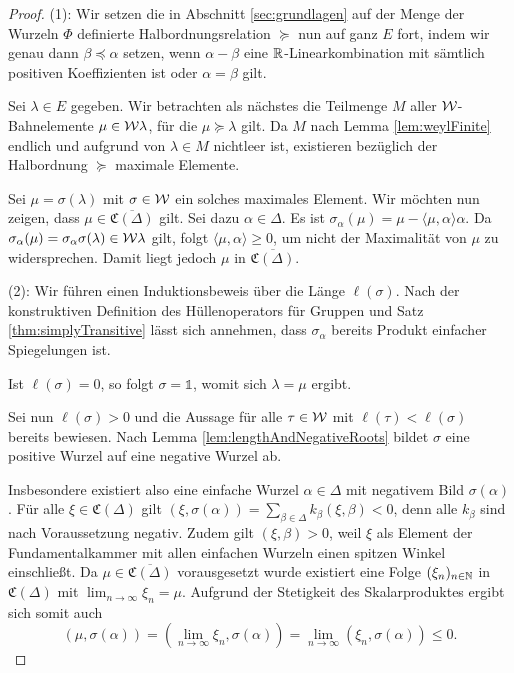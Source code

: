 \begin{proof}
  (1):
  Wir setzen die in Abschnitt \ref{sec:grundlagen} auf der Menge der Wurzeln $\Phi$ definierte Halb\-ordnungsrelation $\succeq$ nun auf ganz $E$ fort, indem wir genau dann $\beta \preceq \alpha$ setzen, wenn $\alpha - \beta$ eine $\mathbb{R}$-Linearkombination mit sämtlich positiven Koeffizienten ist oder $\alpha = \beta$ gilt.

  Sei $\lambda \in E$ gegeben. 
  Wir betrachten als nächstes die Teilmenge $M$ aller $\mathcal{W}$\hyp{}Bahnelemente $\mu \in \mathcal{W}\lambda$, für die $\mu \succeq \lambda$ gilt.
  Da $M$ nach Lemma \ref{lem:weylFinite} endlich und aufgrund von $\lambda \in M$ nichtleer ist, existieren bezüglich der Halbordnung $\succeq$ maximale Elemente.

  Sei $\mu = \sigma(\lambda)$ mit $\sigma \in \mathcal{W}$ ein solches maximales Element.
  Wir möchten nun zeigen, dass $\mu \in \overline{\mathfrak{C}(\Delta)}$ gilt.
  Sei dazu $\alpha \in \Delta$.
  Es ist $\sigma_\alpha(\mu) = \mu - \langle \mu, \alpha \rangle \alpha$.
  Da $\sigma_\alpha(\mu) = \sigma_\alpha \sigma (\lambda) \in \mathcal{W}\lambda$ gilt, folgt $\langle \mu, \alpha \rangle \geq 0$, um nicht der Maximalität von $\mu$ zu widersprechen.
  Damit liegt jedoch $\mu$ in $\overline{\mathfrak{C}(\Delta)}$.

  (2):
  Wir führen einen Induktionsbeweis über die Länge $\ell(\sigma)$.
  Nach der konstruktiven Definition des Hüllenoperators für Gruppen und Satz \ref{thm:simplyTransitive} lässt sich annehmen, dass $\sigma_\alpha$ bereits Produkt einfacher Spiegelungen ist.

  Ist $\ell(\sigma) = 0$, so folgt $\sigma = \mathds{1}$, womit sich $\lambda = \mu$ ergibt.

  Sei nun $\ell(\sigma) > 0$ und die Aussage für alle $\tau \in \mathcal{W}$ mit $\ell(\tau) < \ell(\sigma)$ bereits bewiesen.
  Nach Lemma \ref{lem:lengthAndNegativeRoots} bildet $\sigma$ eine positive Wurzel auf eine negative Wurzel ab.
  
  Insbesondere existiert also eine einfache Wurzel $\alpha \in \Delta$ mit negativem Bild $\sigma(\alpha)$.
  Für alle $\xi \in \mathfrak{C}(\Delta)$ gilt $(\xi, \sigma(\alpha)) = \sum_{\beta \in \Delta} k_\beta (\xi,\beta) < 0$, denn alle $k_\beta$ sind nach Voraussetzung negativ.  
  Zudem gilt $(\xi,\beta) > 0$, weil $\xi$ als Element der Fundamentalkammer mit allen einfachen Wurzeln einen spitzen Winkel einschließt.
  Da $\mu \in \overline{\mathfrak{C}(\Delta)}$ vorausgesetzt wurde existiert eine Folge $(\xi_n)_{n \in \mathbb{N}}$ in $\mathfrak{C}(\Delta)$ mit $\lim_{n \to \infty} \xi_n = \mu$.
  Aufgrund der Stetigkeit des Skalarproduktes ergibt sich somit auch
\begin{displaymath}
  (\mu, \sigma(\alpha)) = (\lim_{n \to \infty} \xi_n, \sigma(\alpha)) = \lim_{n \to \infty} ( \xi_n, \sigma(\alpha)) \leq 0.
\end{displaymath}
  

\end{proof}
